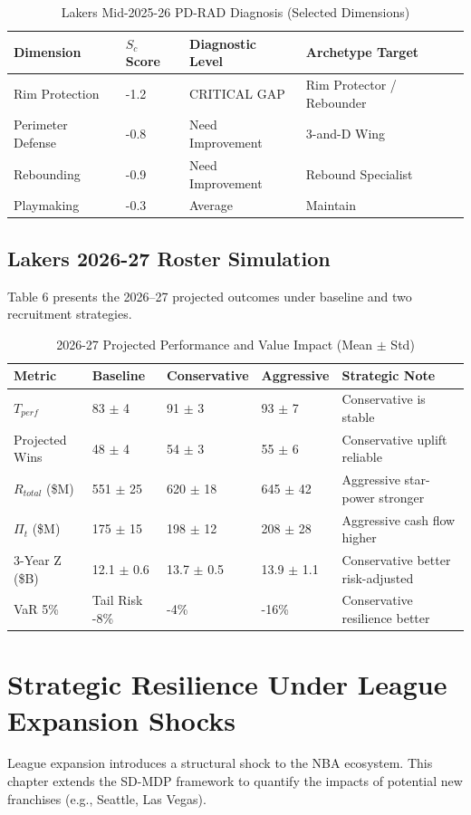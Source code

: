 \documentclass[12pt]{article}
\begin{document}
\begin{table}[H]
\centering
\caption{Lakers Mid-2025-26 PD-RAD Diagnosis (Selected Dimensions)}
\begin{tabular}{llll}
\toprule
\textbf{Dimension} & \textbf{$S_c$ Score} & \textbf{Diagnostic Level} & \textbf{Archetype Target} \\
\midrule
Rim Protection & -1.2 & CRITICAL GAP & Rim Protector / Rebounder \\
Perimeter Defense & -0.8 & Need Improvement & 3-and-D Wing \\
Rebounding & -0.9 & Need Improvement & Rebound Specialist \\
Playmaking & -0.3 & Average & Maintain \\
\bottomrule
\end{tabular}
\end{table}

\subsection{Lakers 2026-27 Roster Simulation}
Table 6 presents the 2026–27 projected outcomes under baseline and two recruitment strategies.

\begin{table}[H]
\centering
\caption{2026-27 Projected Performance and Value Impact (Mean $\pm$ Std)}
\begin{tabular}{lllll}
\toprule
\textbf{Metric} & \textbf{Baseline} & \textbf{Conservative} & \textbf{Aggressive} & \textbf{Strategic Note} \\
\midrule
$T_{perf}$ & 83 $\pm$ 4 & 91 $\pm$ 3 & 93 $\pm$ 7 & Conservative is stable \\
Projected Wins & 48 $\pm$ 4 & 54 $\pm$ 3 & 55 $\pm$ 6 & Conservative uplift reliable \\
$R_{total}$ (\$M) & 551 $\pm$ 25 & 620 $\pm$ 18 & 645 $\pm$ 42 & Aggressive star-power stronger \\
$\Pi_t$ (\$M) & 175 $\pm$ 15 & 198 $\pm$ 12 & 208 $\pm$ 28 & Aggressive cash flow higher \\
3-Year Z (\$B) & 12.1 $\pm$ 0.6 & 13.7 $\pm$ 0.5 & 13.9 $\pm$ 1.1 & Conservative better risk-adjusted \\
VaR 5\% & Tail Risk -8\% & -4\% & -16\% & Conservative resilience better \\
\bottomrule
\end{tabular}
\end{table}

\section{Strategic Resilience Under League Expansion Shocks}
League expansion introduces a structural shock to the NBA ecosystem. This chapter extends the SD-MDP framework to quantify the impacts of potential new franchises (e.g., Seattle, Las Vegas).
\end{document}
